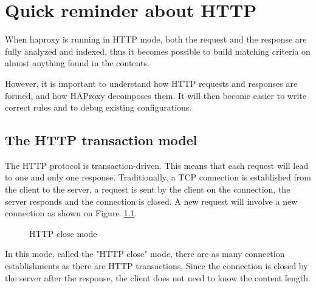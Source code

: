\chapter{Quick reminder about HTTP}
When haproxy is running in HTTP mode, both the request and the response are
fully analyzed and indexed, thus it becomes possible to build matching criteria
on almost anything found in the contents.

However, it is important to understand how HTTP requests and responses are
formed, and how HAProxy decomposes them. It will then become easier to write
correct rules and to debug existing configurations.

\section{The HTTP transaction model}
The HTTP protocol is transaction-driven. This means that each request will lead
to one and only one response. Traditionally, a TCP connection is established
from the client to the server, a request is sent by the client on the
connection, the server responds and the connection is closed. A new request
will involve a new connection as shown on Figure~\ref{fig:http_close}.

\begin{figure}[!h]
\centering
{}

\caption{HTTP close mode}
\label{fig:http_close}
\end{figure}

In this mode, called the "HTTP close" mode, there are as many connection
establishments as there are HTTP transactions. Since the connection is closed
by the server after the response, the client does not need to know the content
length.

